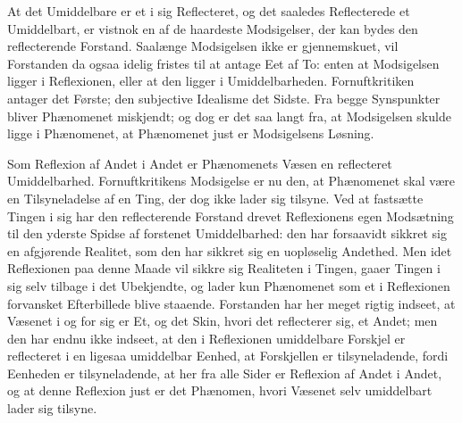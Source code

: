 \documentclass[12pt]{book}
\newcommand{\opage}[1]{\marginnote{\footnotesize\textit{[#1]}}}
\begin{document}
At det Umiddelbare er et i sig Reflecteret, og det saaledes Reflecterede et
Umiddelbart, er vistnok en af de haardeste Modsigelser, der kan bydes den
reflecterende Forstand. Saalænge Modsigelsen ikke er gjennemskuet, vil Forstanden da
ogsaa idelig fristes til at antage Eet af To: enten at Modsigelsen ligger i
Reflexionen, eller at den ligger i Umiddelbarheden. Fornuftkritiken antager det
Første; den subjective Idealisme det Sidste. Fra begge Synspunkter bliver Phænomenet
miskjendt; og dog er det saa langt fra, at Modsigelsen skulde ligge i Phænomenet, at
Phænomenet just er Modsigelsens Løsning.

\opage{82} Som Reflexion af Andet i Andet er Phænomenets Væsen en reflecteret Umiddelbarhed.
Fornuftkritikens Modsigelse er nu den, at Phænomenet skal være en Tilsyneladelse af
en Ting, der dog ikke lader sig tilsyne. Ved at fastsætte Tingen i sig har den
reflecterende Forstand drevet Reflexionens egen Modsætning til den yderste Spidse af
forstenet Umiddelbarhed: den har forsaavidt sikkret sig en afgjørende Realitet, som
den har sikkret sig en uopløselig Andethed. Men idet Reflexionen paa denne Maade vil
sikkre sig Realiteten i Tingen, gaaer Tingen i sig selv tilbage i det Ubekjendte, og
lader kun Phænomenet som et i Reflexionen forvansket Efterbillede blive staaende.
Forstanden har her meget rigtig indseet, at Væsenet i og for sig er Et, og det Skin,
hvori det reflecterer sig, et Andet; men den har endnu ikke indseet, at den i
Reflexionen umiddelbare Forskjel er reflecteret i en ligesaa umiddelbar Eenhed, at
Forskjellen er tilsyneladende, fordi Eenheden er tilsyneladende, at her fra alle
Sider er Reflexion af Andet i Andet, og at denne Reflexion just er det Phænomen,
hvori Væsenet selv umiddelbart lader sig tilsyne.
\end{document}
